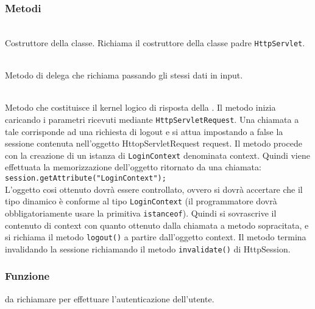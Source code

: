 \subsubsection*{Metodi}
\begin{description}
	\item{}\\
	Costruttore della classe. Richiama il costruttore della classe padre \texttt{HttpServlet}.
	
	\item{}\\
	Metodo di delega che richiama  passando gli stessi dati in input.
	
	\item{}\\
	Metodo che costituisce il kernel logico di risposta della . Il metodo inizia caricando i parametri ricevuti mediante \texttt{HttpServletRequest}. Una chiamata a tale  corrisponde ad una richiesta di logout e si attua impostando a false la sessione contenuta nell'oggetto HttopServletRequest request. Il metodo procede con la creazione di un istanza  di \texttt{LoginContext} denominata context. Quindi viene effettuata la memorizzazione dell'oggetto ritornato da una chiamata:
\\
\verb|session.getAttribute("LoginContext");|
\\

L'oggetto cosi ottenuto dovrà essere controllato, ovvero si dovrà accertare che il tipo dinamico è conforme al tipo \texttt{LoginContext} (il programmatore dovrà obbligatoriamente usare   la primitiva \texttt{istanceof}). Quindi si sovrascrive il contenuto di context con quanto ottenuto dalla chiamata a metodo sopracitata, e si richiama il metodo \texttt{logout()} a partire dall'oggetto context. Il metodo termina invalidando la sessione richiamando il metodo \texttt{invalidate()} di HttpSession.

\end{description}


\subsubsection*{Funzione}
 da richiamare per effettuare l'autenticazione dell'utente.

